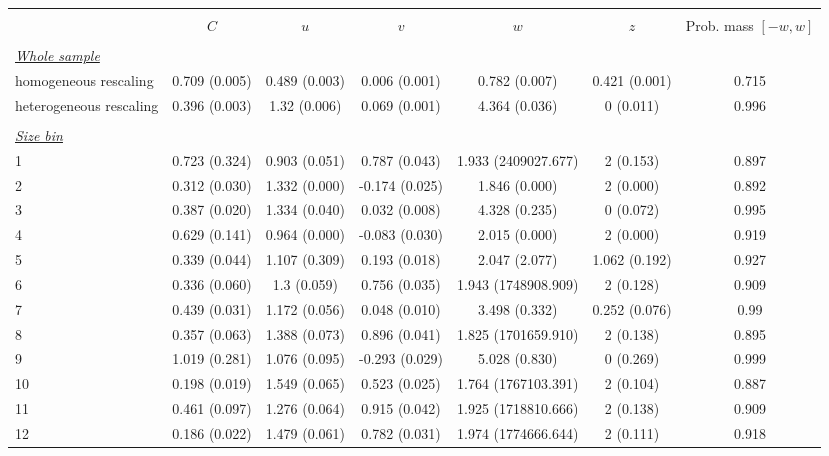 
\begin{tabular}{@{\extracolsep{5pt}} l cccccc} 
\\[-1.8ex]\hline 
\hline \\[-1.8ex] 
 & $C$ & $u$ & $v$ & $w$ & $z$ & Prob. mass $[-w,w]$ \\ 
\hline \\[-1.8ex] 
\underline{{\it Whole sample}} &   &   &   &   &   &  \\ 
homogeneous rescaling & 0.709 (0.005) & 0.489 (0.003) & 0.006 (0.001) & 0.782 (0.007) & 0.421 (0.001) & 0.715 \\ 
heterogeneous rescaling & 0.396 (0.003) & 1.32 (0.006) & 0.069 (0.001) & 4.364 (0.036) & 0 (0.011) & 0.996 \\ 
 &   &   &   &   &   &  \\ 
\underline{{\it Size bin}} &   &   &   &   &   &  \\ 
1 & 0.723 (0.324) & 0.903 (0.051) & 0.787 (0.043) & 1.933 (2409027.677) & 2 (0.153) & 0.897 \\ 
2 & 0.312 (0.030) & 1.332 (0.000) & -0.174 (0.025) & 1.846 (0.000) & 2 (0.000) & 0.892 \\ 
3 & 0.387 (0.020) & 1.334 (0.040) & 0.032 (0.008) & 4.328 (0.235) & 0 (0.072) & 0.995 \\ 
4 & 0.629 (0.141) & 0.964 (0.000) & -0.083 (0.030) & 2.015 (0.000) & 2 (0.000) & 0.919 \\ 
5 & 0.339 (0.044) & 1.107 (0.309) & 0.193 (0.018) & 2.047 (2.077) & 1.062 (0.192) & 0.927 \\ 
6 & 0.336 (0.060) & 1.3 (0.059) & 0.756 (0.035) & 1.943 (1748908.909) & 2 (0.128) & 0.909 \\ 
7 & 0.439 (0.031) & 1.172 (0.056) & 0.048 (0.010) & 3.498 (0.332) & 0.252 (0.076) & 0.99 \\ 
8 & 0.357 (0.063) & 1.388 (0.073) & 0.896 (0.041) & 1.825 (1701659.910) & 2 (0.138) & 0.895 \\ 
9 & 1.019 (0.281) & 1.076 (0.095) & -0.293 (0.029) & 5.028 (0.830) & 0 (0.269) & 0.999 \\ 
10 & 0.198 (0.019) & 1.549 (0.065) & 0.523 (0.025) & 1.764 (1767103.391) & 2 (0.104) & 0.887 \\ 
11 & 0.461 (0.097) & 1.276 (0.064) & 0.915 (0.042) & 1.925 (1718810.666) & 2 (0.138) & 0.909 \\ 
12 & 0.186 (0.022) & 1.479 (0.061) & 0.782 (0.031) & 1.974 (1774666.644) & 2 (0.111) & 0.918 \\ 

\end{tabular}
